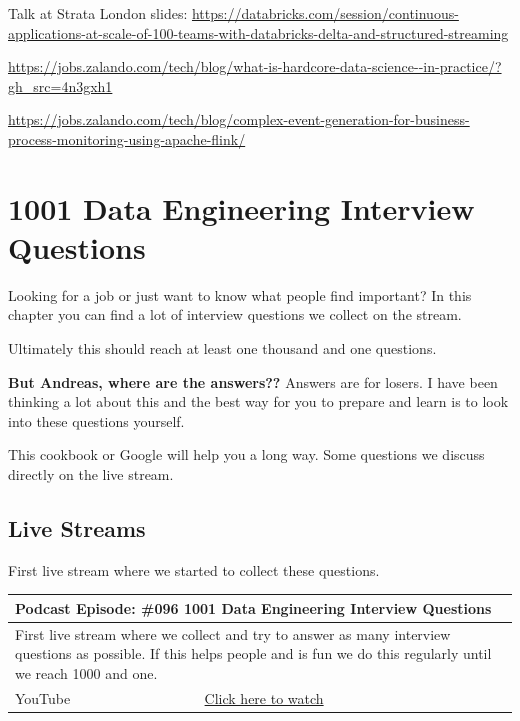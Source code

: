\documentclass[12pt, numbers=noenddot]{scrreprt} %
\begin{document}
Talk at Strata London slides:
\url{https://databricks.com/session/continuous-applications-at-scale-of-100-teams-with-databricks-delta-and-structured-streaming}


\url{https://jobs.zalando.com/tech/blog/what-is-hardcore-data-science--in-practice/?gh_src=4n3gxh1}

\url{https://jobs.zalando.com/tech/blog/complex-event-generation-for-business-process-monitoring-using-apache-flink/}



\part{1001 Data Engineering Interview Questions}

Looking for a job or just want to know what people find important?
In this chapter you can find a lot of interview questions we collect on the stream.

Ultimately this should reach at least one thousand and one questions.

\textbf{But Andreas, where are the answers??}
Answers are for losers. I have been thinking a lot about this and the best way for you to prepare and learn is to look into these questions yourself.

This cookbook or Google will help you a long way. Some questions we discuss directly on the live stream.

\chapter{Live Streams}

First live stream where we started to collect these questions.

\begin{table}[h]
\begin{tabular}{ll}
\hline
\multicolumn{2}{l}{\textbf{Podcast Episode:} \#096 1001 Data Engineering Interview Questions} \\ \hline
\multicolumn{2}{p{15cm}}{First live stream where we collect and try to answer as many interview questions as possible. If this helps people and is fun we do this regularly until we reach 1000 and one.}         \\ \hline
\multicolumn{1}{l|}{YouTube}   & \href{https://youtu.be/WbqRH2r3N40}{Click here to watch}   \\  \hline
\end{tabular}
\end{table}
\end{document}
